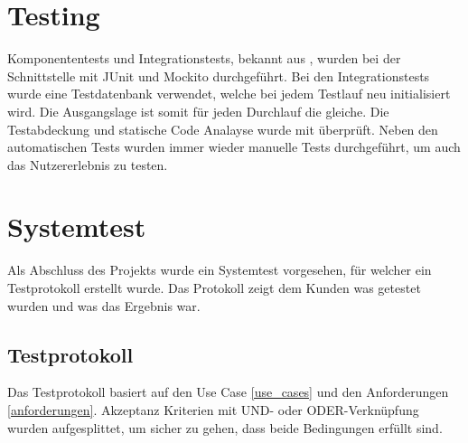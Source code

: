 \section{Testing}
Komponententests und Integrationstests, bekannt aus \cite{test_soft_book}, wurden bei der Schnittstelle mit JUnit und Mockito durchgeführt. Bei den Integrationstests wurde eine 
Testdatenbank verwendet, welche bei jedem Testlauf neu initialisiert wird. Die Ausgangslage ist somit für jeden Durchlauf die gleiche. Die Testabdeckung und statische Code Analayse wurde 
mit  überprüft. Neben den automatischen Tests wurden immer wieder manuelle Tests durchgeführt, um auch das Nutzererlebnis zu testen.

\section{Systemtest}
Als Abschluss des Projekts wurde ein Systemtest vorgesehen, für welcher ein Testprotokoll erstellt wurde. Das Protokoll zeigt dem Kunden was getestet wurden und was das Ergebnis war.

\subsection{Testprotokoll}
Das Testprotokoll basiert auf den Use Case \ref{use_cases} und den Anforderungen \ref{anforderungen}. Akzeptanz Kriterien mit UND- oder ODER-Verknüpfung wurden 
aufgesplittet, um sicher zu gehen, dass beide Bedingungen erfüllt sind.

